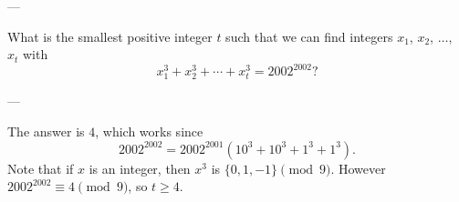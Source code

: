 
---

What is the smallest positive integer $t$ such that we can find integers $x_1$, $x_2$, $\ldots$, $x_t$ with \[x_1^3+x_2^3+\cdots+x_t^3=2002^{2002}?\]

---

The answer is $4$, which works since \[2002^{2002}=2002^{2001}\left(10^3+10^3+1^3+1^3\right).\]
Note that if $x$ is an integer, then $x^3$ is $\{0,1,-1\}\pmod9$. However $2002^{2002}\equiv4\pmod9$, so $t\ge4$.


